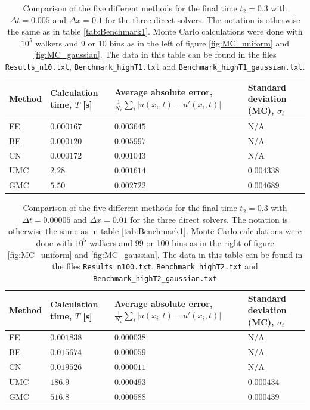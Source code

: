 \documentclass[a4paper, 11pt, notitlepage,english]{article}
\begin{document}
\begin{table}[h!tb]
\begin{center}
\begin{tabular}{p{2cm} p{2cm} p{4cm} p{2.5cm}}
\toprule
Method & Calculation time, $T$ [s] & Average absolute error, $\frac{1}{N_x}\sum_i\lvert u(x_i,t) - u'(x_i,t) \rvert$ & Standard deviation (MC), $\sigma_t$ \\ \midrule
FE & $0.000167$ & $0.003645$ & N/A \\
BE & $0.000120$ & $0.005997$ & N/A \\
CN & $0.000172$ & $0.001043$ & N/A \\
UMC & $2.28$ & $0.001614$ & $0.004338$ \\
GMC & $5.50$ & $0.002722$ & $0.004689$ \\
\bottomrule
\end{tabular}
\caption{Comparison of the five different methods for the final time $t_2 = 0.3$ with $\Delta t = 0.005$ and $\Delta x=0.1$ for the three direct solvers. The notation is otherwise the same as in table \ref{tab:Benchmark1}. Monte Carlo calculations were done with $10^{5}$ walkers and 9 or 10 bins as in the left of figure \ref{fig:MC_uniform} and \ref{fig:MC_gaussian}. The data in this table can be found in the files \texttt{Results\_n10.txt}, \texttt{Benchmark\_highT1.txt} and \texttt{Benchmark\_highT1\_gaussian.txt}.} 
\label{tab:Benchmark3}
\end{center}
\end{table}

\begin{table}[h!tb]
\begin{center}
\begin{tabular}{p{2cm} p{2cm} p{4cm} p{2.5cm}}
\toprule
Method & Calculation time, $T$ [s] & Average absolute error, $\frac{1}{N_x}\sum_i\lvert u(x_i,t) - u'(x_i,t) \rvert$ & Standard deviation (MC), $\sigma_t$ \\ \midrule
FE & $0.001838$ & $0.000038$ & N/A \\
BE & $0.015674$ & $0.000059$ & N/A \\
CN & $0.019526$ & $0.000011$ & N/A \\
UMC & $186.9$ & $0.000493$ & $0.000434$ \\
GMC & $516.8$ & $0.000588$ & $0.000439$ \\
\bottomrule
\end{tabular}
\caption{Comparison of the five different methods for the final time $t_2 = 0.3$ with $\Delta t = 0.00005$ and $\Delta x=0.01$ for the three direct solvers. The notation is otherwise the same as in table \ref{tab:Benchmark1}. Monte Carlo calculations were done with $10^{5}$ walkers and 99 or 100 bins as in the right of figure \ref{fig:MC_uniform} and \ref{fig:MC_gaussian}. The data in this table can be found in the files \texttt{Results\_n100.txt}, \texttt{Benchmark\_highT2.txt} and \texttt{Benchmark\_highT2\_gaussian.txt}} 
\label{tab:Benchmark4}
\end{center}
\end{table}
\end{document}
